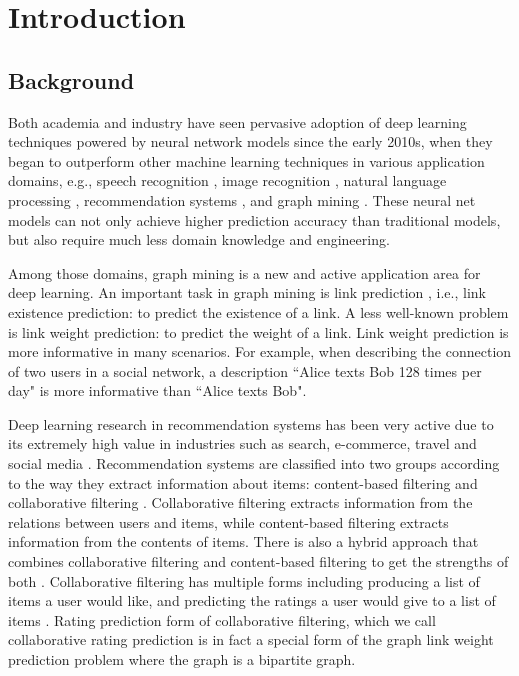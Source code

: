 \documentclass[12pt]{WSUThesis}
\theoremstyle{definition}
\begin{document}
\setUpTables

%

\setUpThesisStyle
\setcounter{chapter}{0}
\chapter{Introduction}
\label{chapter:introduction}

\section{Background}
Both academia and industry have seen pervasive adoption of deep learning 
techniques powered by neural network models since the early 2010s,
when they began to outperform other machine learning techniques in various 
application domains, e.g.,
speech recognition \cite{hannun2014deep},
image recognition \cite{simonyan2014very},
natural language processing \cite{yao2013recurrent},
recommendation systems \cite{barkan2016item2vec},
and graph mining \cite{grover2016node2vec}.
These neural net models can not only achieve higher prediction accuracy than 
traditional models,
but also require much less domain knowledge and engineering.

Among those domains,
graph mining is a new and active application area for deep learning.
An important task in graph mining is link prediction \cite{liben2007link} 
\cite{al2006link}, i.e., link existence prediction:
to predict the existence of a link.
A less well-known problem is link weight prediction: to predict the weight of a link.
Link weight prediction is more informative in many scenarios.
For example, when describing the connection of two users in a social network,
a description ``Alice texts Bob 128 times per day" is more informative than
``Alice texts Bob".

Deep learning research in recommendation systems has been very active  
due to its extremely high value in industries such as search, e-commerce, 
travel and social media \cite{buettner2016predicting}.
Recommendation systems are classified into two groups according to the way they 
extract information about items: content-based filtering and collaborative 
filtering \cite{ricci2011introduction}.
Collaborative filtering extracts information from the relations between users 
and items, while content-based filtering extracts information from the contents 
of items.
There is also a hybrid approach that combines collaborative filtering and 
content-based filtering to get the strengths of both 
\cite{adomavicius2005toward}.
Collaborative filtering has multiple forms including producing a list of items 
a user would like, and predicting the ratings a user would give to a list of 
items \cite{su2009survey}.
Rating prediction form of collaborative 
filtering, which we call collaborative rating prediction is in fact a special form of the graph link weight prediction problem where the graph is a bipartite graph.
\end{document}
